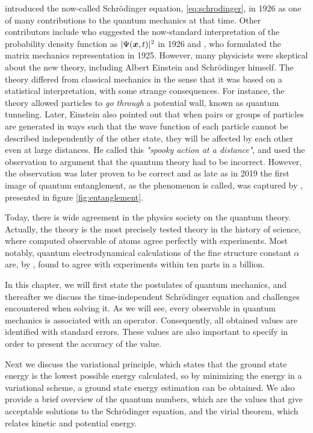 \citet{schrodinger_undulatory_1926} introduced the now-called Schrödinger equation, \eqref{eq:schrodinger}, in 1926 as one of many contributions to the quantum mechanics at that time. Other contributors include \citet{born_zur_1926} who suggested the now-standard interpretation of the probability density function as $|\Psi(\boldsymbol{{x}},t)|^2$ in 1926 and \citet{heisenberg_uber_1925}, who formulated the matrix mechanics representation in 1925. However, many physicists were skeptical about the new theory, including Albert Einstein and Schrödinger himself. The theory differed from classical mechanics in the sense that it was based on a statistical interpretation, with some strange consequences. For instance, the theory allowed particles to \textit{go through} a potential wall, known as quantum tunneling. Later, Einstein \supercite{einstein_can_1935} also pointed out that when pairs or groups of particles are generated in ways such that the wave function of each particle cannot be described independently of the other state, they will be affected by each other even at large distances. He called this \textit{"spooky action at a distance"}, and used the observation to argument that the quantum theory had to be incorrect. However, the observation was later proven to be correct and as late as in 2019 the first image of quantum entanglement, as the phenomenon is called, was captured by \citet{moreau_imaging_2019}, presented in figure \eqref{fig:entanglement}.

Today, there is wide agreement in the physics society on the quantum theory. Actually, the theory is the most precisely tested theory in the history of science, where computed observable of atoms agree perfectly with experiments. Most notably, quantum electrodynamical calculations of the fine structure constant $\alpha$ are, by \citet{odom_new_2006}, found to agree with experiments within ten parts in a billion.

In this chapter, we will first state the postulates of quantum mechanics, and thereafter we discuss the time-independent Schrödinger equation and challenges encountered when solving it. As we will see, every observable in quantum mechanics is associated with an operator. Consequently, all obtained values are identified with standard errors. These values are also important to specify in order to present the accuracy of the value.

Next we discuss the variational principle, which states that the ground state energy is the lowest possible energy calculated, so by minimizing the energy in a variational scheme, a ground state energy estimation can be obtained. We also provide a brief overview of the quantum numbers, which are the values that give acceptable solutions to the Schrödinger equation, and the virial theorem, which relates kinetic and potential energy. 

